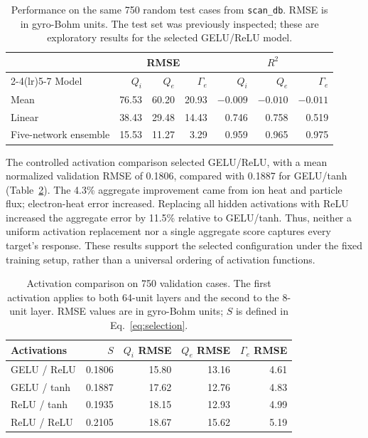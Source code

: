\documentclass[12pt,letterpaper]{article}
\begin{document}
\begin{table}[htbp]
  \centering
  \caption{Performance on the same 750 random test cases from
    \texttt{scan\_db}. RMSE is in gyro-Bohm units. The test set was previously
    inspected; these are exploratory results for the selected GELU/ReLU model.}
  \label{tab:test}
  \small
  \setlength{\tabcolsep}{5pt}
  \begin{tabular}{lrrrrrr}
    \toprule
                          & \multicolumn{3}{c}{RMSE} & \multicolumn{3}{c}{$R^2$}                                                 \\
    \cmidrule(lr){2-4}\cmidrule(lr){5-7}
    Model                 & $Q_i$                    & $Q_e$                     & $\Gamma_e$ & $Q_i$    & $Q_e$    & $\Gamma_e$ \\
    \midrule
    Mean                  & 76.53                    & 60.20                     & 20.93      & $-0.009$ & $-0.010$ & $-0.011$   \\
    Linear                & 38.43                    & 29.48                     & 14.43      & 0.746    & 0.758    & 0.519      \\
    Five-network ensemble & 15.53                    & 11.27                     & 3.29       & 0.959    & 0.965    & 0.975      \\
    \bottomrule
  \end{tabular}
\end{table}

The controlled activation comparison selected GELU/ReLU, with a mean
normalized validation RMSE of 0.1806, compared with 0.1887 for GELU/tanh
(Table~\ref{tab:activations}). The 4.3\% aggregate improvement came from
ion heat and particle flux; electron-heat error increased. Replacing all
hidden activations with ReLU increased the aggregate error by 11.5\%
relative to GELU/tanh. Thus, neither a uniform activation replacement nor a
single aggregate score captures every target's response. These results
support the selected configuration under the fixed training setup, rather
than a universal ordering of activation functions.

\begin{table}[H]
  \centering
  \caption{Activation comparison on 750 validation cases. The first activation
    applies to both 64-unit layers and the second to the 8-unit layer.
    RMSE values are in gyro-Bohm units; $S$ is defined in Eq.~\ref{eq:selection}.}
  \label{tab:activations}
  \small
  \begin{tabular}{lrrrr}
    \toprule
    Activations & $S$    & $Q_i$ RMSE & $Q_e$ RMSE & $\Gamma_e$ RMSE \\
    \midrule
    GELU / ReLU & 0.1806 & 15.80      & 13.16      & 4.61            \\
    GELU / tanh & 0.1887 & 17.62      & 12.76      & 4.83            \\
    ReLU / tanh & 0.1935 & 18.15      & 12.93      & 4.99            \\
    ReLU / ReLU & 0.2105 & 18.67      & 15.62      & 5.19            \\
    \bottomrule
  \end{tabular}
\end{table}
\end{document}
